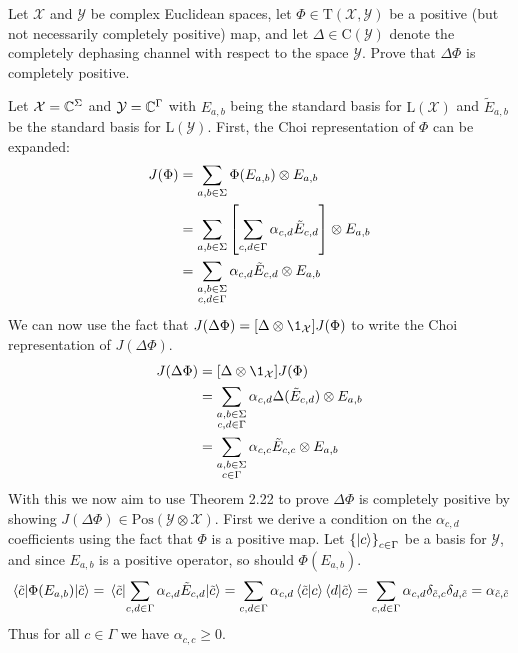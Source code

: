 \documentclass[boxes,pages,color=SeaGreen]{homework}
\newcommand{\X}{\mathcal{X}}
\newcommand{\Y}{\mathcal{Y}}
\newcommand{\Lin}{\mathrm{L}}
\newcommand{\Trans}{\mathrm{T}}
\newcommand{\Pos}{\mathrm{Pos}}
\newcommand{\Channel}{\mathrm{C}}
\begin{document}

\begin{problem}
Let $\X$ and $\Y$ be complex Euclidean spaces, let $\Phi\in\Trans(\X,\Y)$
be a positive (but not necessarily completely positive) map, and let
$\Delta\in\Channel(\Y)$ denote the completely dephasing channel with
respect to the space $\Y$.
Prove that $\Delta\Phi$ is completely positive.
\end{problem}

\begin{solution}
    Let $\X = \C^\Sigma$ and $\Y = \C^\Gamma$ with $E_{a,b}$ being the standard basis for $\Lin(\X)$ and $\tilde{E}_{a,b}$ be the standard basis for $\Lin(\Y)$.
    First, the Choi representation of $\Phi$ can be expanded:
    \begin{align*}
        J(\Phi) & = \sum_{a,b\in\Sigma}\Phi(E_{a,b})\otimes E_{a,b}                                        \\
                & = \sum_{a,b\in\Sigma}\qty[\sum_{c,d\in\Gamma}\alpha_{c,d}\tilde{E}_{c,d}]\otimes E_{a,b} \\
                & = \sum_{\substack{a,b\in\Sigma                                                           \\ c,d\in\Gamma}}\alpha_{c,d}\tilde{E}_{c,d}\otimes E_{a,b}
    \end{align*}
    We can now use the fact that $J(\Delta\Phi) = \qty[\Delta\otimes\1_\X]J(\Phi)$ to write the Choi representation of $J(\Delta\Phi)$.
    \begin{align*}
        J(\Delta\Phi) & = \qty[\Delta\otimes\1_\X]J(\Phi) \\
                      & = \sum_{\substack{a,b\in\Sigma    \\ c,d\in\Gamma}}\alpha_{c,d}\Delta(\tilde{E}_{c,d})\otimes E_{a,b} \\
                      & = \sum_{\substack{a,b\in\Sigma    \\ c\in\Gamma}}\alpha_{c,c}\tilde{E}_{c,c}\otimes E_{a,b}
    \end{align*}
    With this we now aim to use Theorem 2.22 to prove $\Delta\Phi$ is completely positive by showing $J(\Delta\Phi)\in\Pos(\Y\otimes\X)$.
    First we derive a condition on the $\alpha_{c,d}$ coefficients using the fact that $\Phi$ is a positive map.
    Let $\qty{\ket{c}}_{c\in\Gamma}$ be a basis for $\Y$, and since $E_{a,b}$ is a positive operator, so should $\Phi(E_{a,b})$.
    \begin{equation*}
        \ev{\Phi(E_{a,b})}{\tilde{c}} = \ev{\sum_{c,d\in\Gamma}\alpha_{c,d}\tilde{E}_{c,d}}{\tilde{c}} = \sum_{c,d\in\Gamma}\alpha_{c,d}\braket{\tilde{c}}{c}\braket{d}{\tilde{c}} = \sum_{c,d\in\Gamma}\alpha_{c,d}\delta_{\tilde{c},c}\delta_{d,\tilde{c}} = \alpha_{\tilde{c},\tilde{c}}
    \end{equation*}
    Thus for all $c\in\Gamma$ we have $\alpha_{c,c} \geq 0$.


\end{solution}
\end{document}
